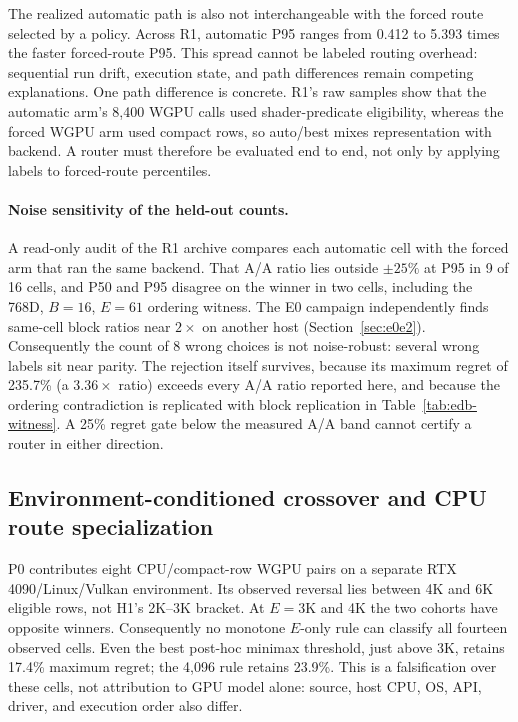 \documentclass[10pt]{article}
\begin{document}
The realized automatic path is also not interchangeable with the forced route selected by a policy. Across R1, automatic P95 ranges from 0.412 to 5.393 times the faster forced-route P95. This spread cannot be labeled routing overhead: sequential run drift, execution state, and path differences remain competing explanations. One path difference is concrete. R1's raw samples show that the automatic arm's 8,400 WGPU calls used shader-predicate eligibility, whereas the forced WGPU arm used compact rows, so auto/best mixes representation with backend. A router must therefore be evaluated end to end, not only by applying labels to forced-route percentiles.

\paragraph{Noise sensitivity of the held-out counts.} A read-only audit of the R1 archive compares each automatic cell with the forced arm that ran the same backend. That A/A ratio lies outside $\pm25\%$ at P95 in 9 of 16 cells, and P50 and P95 disagree on the winner in two cells, including the 768D, $B=16$, $E=61$ ordering witness. The E0 campaign independently finds same-cell block ratios near $2\times$ on another host (Section~\ref{sec:e0e2}). Consequently the count of 8 wrong choices is not noise-robust: several wrong labels sit near parity. The rejection itself survives, because its maximum regret of 235.7\% (a $3.36\times$ ratio) exceeds every A/A ratio reported here, and because the ordering contradiction is replicated with block replication in Table~\ref{tab:edb-witness}. A 25\% regret gate below the measured A/A band cannot certify a router in either direction.

\subsection{Environment-conditioned crossover and CPU route specialization}
P0 contributes eight CPU/compact-row WGPU pairs on a separate RTX 4090/Linux/Vulkan environment. Its observed reversal lies between 4K and 6K eligible rows, not H1's 2K--3K bracket. At $E=3$K and 4K the two cohorts have opposite winners. Consequently no monotone $E$-only rule can classify all fourteen observed cells. Even the best post-hoc minimax threshold, just above 3K, retains 17.4\% maximum regret; the 4,096 rule retains 23.9\%. This is a falsification over these cells, not attribution to GPU model alone: source, host CPU, OS, API, driver, and execution order also differ.
\end{document}
